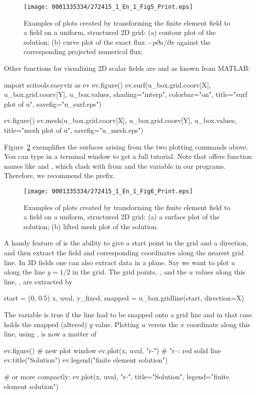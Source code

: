 \begin{figure}[t]
  \centering
  \texttt{[image: 0001335334/272415\_1\_En\_1\_Fig5\_Print.eps]}
  \caption{Examples of plots created by transforming the finite
    element field to a field on a uniform, structured 2D grid: (a)
    contour plot of the solution; (b) curve plot of the exact flux
    $-p\partial u/\partial x$ against the corresponding projected
    numerical flux.}
  \label{langtangen:poisson:2D:fig2}
\end{figure}

Other functions for visualizing 2D scalar fields are  and
 as known from MATLAB:
\begin{python}
import scitools.easyviz as ev
ev.figure()
ev.surf(u_box.grid.coorv[X], u_box.grid.coorv[Y], u_box.values,
        shading="interp", colorbar="on",
        title="surf plot of u", savefig="u_surf.eps")

ev.figure()
ev.mesh(u_box.grid.coorv[X], u_box.grid.coorv[Y], u_box.values,
        title="mesh plot of u", savefig="u_mesh.eps")
\end{python}
Figure~\ref{langtangen:poisson:2D:fig3} exemplifies the surfaces
arising from the two plotting commands above.  You can type
 in a terminal
window to get a full tutorial.
Note that  offers function names like
 and , which clash with  from 
and the  variable in our programs. Therefore, we recommend the
 prefix.

\begin{figure}[t]
  \centering
  \texttt{[image: 0001335334/272415\_1\_En\_1\_Fig6\_Print.eps]}
  \caption{Examples of plots created by transforming the finite
    element field to a field on a uniform, structured 2D grid: (a) a
    surface plot of the solution; (b) lifted mesh plot of the
  solution.}
  \label{langtangen:poisson:2D:fig3}
\end{figure}

A handy feature of  is the
ability to give a start point in the grid and a direction, and then
extract the field and corresponding coordinates along the nearest grid
line. In 3D fields one can also extract data in a plane.  Say we want
to plot $u$ along the line $y=1/2$ in the grid. The grid points,
, and the $u$ values along this line,
, are extracted by
\begin{python}
start = (0, 0.5)
x, uval, y_fixed, snapped = u_box.gridline(start, direction=X)
\end{python}
The variable  is true if the line had to be snapped onto a
grid line and in that case  holds the snapped
(altered) $y$ value.
Plotting $u$ versus the $x$ coordinate along this line, using
, is now a matter of
\begin{python}
ev.figure()  # new plot window
ev.plot(x, uval, "r-")  # "r--: red solid line
ev.title("Solution")
ev.legend("finite element solution")

# or more compactly:
ev.plot(x, uval, "r-", title="Solution",
        legend="finite element solution")
\end{python}

